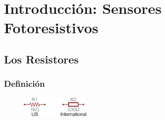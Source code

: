 \documentclass[12pt, fleqn]{article}                            %
\theoremstyle{break}                                            %
\begin{document}
\restoregeometry                                                    %
\nopagecolor                                                        %




\tableofcontents{}
\label{sec:Index}

\clearpage



\section{Introducción: Sensores Fotoresistivos}


    \subsection{Los Resistores}


        \subsubsection{Definición}

            \begin{figure}
                \centering
                \includegraphics[width=0.30\textwidth]{Resistencias}
            \end{figure}
\end{document}
